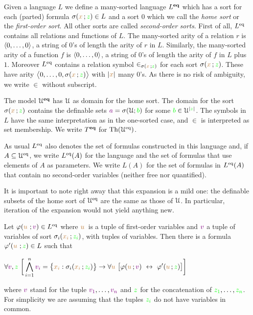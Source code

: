 \documentclass[creche.tex]{subfiles}
\begin{document}
Given a language $L$ we define a many-sorted language \emph{$L^{\rm\textbf{eq}}$\/} which has a sort for each (parted) formula $\sigma({\color{brown} x}\,;{\color{green} z})\in L$ and a sort \emph{$0$\/} which we call the \emph{home sort\/} or the \emph{first-order sort}. All other sorts are called \emph{second-order sorts}. First of all, $L^{{\rm eq}}$ contains all relations and functions of $L$. The many-sorted arity of a relation $r$ is $\langle0,\dots,0\rangle$, a string of $0$'s of length the arity of $r$ in $L$.  Similarly, the many-sorted arity of a function $f$ is $\langle0,\dots,0\rangle$, a string of $0$'s of length the arity of $f$ in $L$ plus $1$. Moreover $L^{{\rm eq}}$ contains a relation symbol $\in_{\sigma({\color{brown} x}\,;{\color{green} z})}$ for each sort $\sigma({\color{brown} x}\,;{\color{green} z})$. These have arity $\big\langle0,\dots,0,\sigma({\color{brown} x}\,;{\color{green} z})\big\rangle$ with $|{\color{brown} x}|$ many $0$'s. As there is no risk of ambiguity, we write $\in$ without subscript.

The model \emph{$\EuScript U^{\rm\textbf{eq}}$\/} has $\EuScript U$ as domain for the home sort. The domain for the sort $\sigma({\color{brown} x}\,;{\color{green} z})$ contains the definable sets ${\color{violet} a}=\sigma(\EuScript U;{\color{green} b})$ for some ${\color{green} b}\in\EuScript U^{|{\color{green} z}|}$. The symbols in $L$ have the same interpretation as in the one-sorted case, and $\in$ is interpreted as set membership. We write \emph{$T^{\rm\textbf{eq}}$\/} for $\textrm{Th}(\EuScript U^{{\rm eq}})$.

As usual \emph{$L^{{\rm eq}}$\/} also denotes the set of formulas constructed in this language and, if $A\subseteq\EuScript U^{{\rm eq}}$, we write  \emph{$L^{{\rm eq}}(A)$\/} for the language and the set of formulas that use elements of $A$ as parameters. We write \emph{$L(A)$\/} for the set of formulas in $L^{{\rm eq}}(A)$ that contain no second-order variables (neither free nor quantified).  



It is important to note right away that this expansion is a mild one: the definable subsets of the home sort of $\EuScript U^{{\rm eq}}$ are the same as those of $\EuScript U$. In particular, iteration of the expansion would not yield anything new. 



\begin{proposition}\label{prop_eqmild}
Let $\varphi({\color{brown} u}\,\,;{\color{violet} v})\in L^{{\rm eq}}$ where ${\color{brown} u}\,$ is a tuple of first-order variables and  ${\color{violet} v}$ a tuple of variables of sort $\sigma_i({\color{brown} x_i}\,;{\color{green} z_i})$, with tuples of variables. Then there is a formula $\varphi'({\color{brown} u}\,\,;{\color{green} z})\in L$ such that 

\hfil$\displaystyle\A {\vl v},{\gr z}\ \bigg[\bigwedge^n_{i=1}{\vl v_i}=\big\{{\mr x_i}:\sigma_i({\mr x_i}\,;{\gr z_i})\big\}\imp\A {\mr u}\ \big[\phi({\mr u}\,;{\vl v})\ \iff\ \phi'({\mr u}\,;{\gr z})\big]\bigg]$

where ${\color{violet} v}$ stand for the tuple ${\color{violet} v_1},\dots,{\color{violet} v_n}$ and ${\color{green} z}$ for the concatenation of ${\color{green} z_1},\dots,{\color{green} z_n}$. For simplicity we are assuming that the tuples ${\color{green} z_i}$ do not have variables in common.
\end{proposition}
\end{document}
